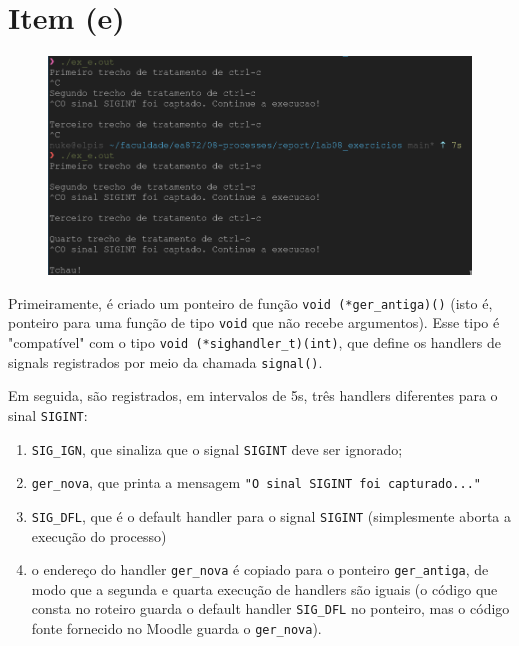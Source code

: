 \documentclass{article}
\begin{document}
\newpage
\section*{Item (e)}
\begin{figure}[!ht]
    \begin{center}
        \includegraphics[width=\textwidth]{images/item_e.png}
    \end{center}
\end{figure} 
\FloatBarrier

Primeiramente, é criado um ponteiro de função \texttt{void (*ger\_antiga)()} (isto é, ponteiro para uma função de tipo \texttt{void} que não recebe argumentos). Esse tipo é "compatível" com o tipo \texttt{void (*sighandler\_t)(int)}, que define os handlers de signals registrados por meio da chamada \texttt{signal()}.

Em seguida, são registrados, em intervalos de 5s, três handlers diferentes para o sinal \texttt{SIGINT}:

\begin{enumerate}
    \item \texttt{SIG\_IGN}, que sinaliza que o signal \texttt{SIGINT} deve ser ignorado;
    \item \texttt{ger\_nova}, que printa a mensagem \texttt{"O sinal SIGINT foi capturado..."}
    \item \texttt{SIG\_DFL}, que é o default handler para o signal \texttt{SIGINT} (simplesmente aborta a execução do processo)
    \item o endereço do handler \texttt{ger\_nova} é copiado para o ponteiro \texttt{ger\_antiga}, de modo que a segunda e quarta execução de handlers são iguais (o código que consta no roteiro guarda o default handler \texttt{SIG\_DFL} no ponteiro, mas o código fonte fornecido no Moodle guarda o \texttt{ger\_nova}).
\end{enumerate}
\end{document}
